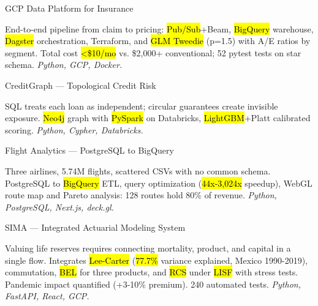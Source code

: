 \documentclass[10pt, letterpaper]{awesome-cv}
\begin{document}
\begin{cventries}

  \cventry
    {GCP Data Platform for Insurance}
    {}
    {}
    {}
    {
      \begin{cvitems}
        \item {End-to-end pipeline from claim to pricing: \hl{Pub/Sub}+Beam, \hl{BigQuery} warehouse, \hl{Dagster} orchestration, Terraform, and \hl{GLM Tweedie} (p=1.5) with A/E ratios by segment. Total cost \hl{<\$10/mo} vs. \$2,000+ conventional; 52 pytest tests on star schema. \textit{Python, GCP, Docker.}}
      \end{cvitems}
    }

  \cventry
    {CreditGraph — Topological Credit Risk}
    {}
    {}
    {}
    {
      \begin{cvitems}
        \item {SQL treats each loan as independent; circular guarantees create invisible exposure. \hl{Neo4j} graph with \hl{PySpark} on Databricks, \hl{LightGBM}+Platt calibrated scoring. \textit{Python, Cypher, Databricks.}}
      \end{cvitems}
    }

  \cventry
    {Flight Analytics — PostgreSQL to BigQuery}
    {}
    {}
    {}
    {
      \begin{cvitems}
        \item {Three airlines, 5.74M flights, scattered CSVs with no common schema. PostgreSQL to \hl{BigQuery} ETL, query optimization (\hl{44x-3,024x} speedup), WebGL route map and Pareto analysis: 128 routes hold 80\% of revenue. \textit{Python, PostgreSQL, Next.js, deck.gl.}}
      \end{cvitems}
    }

  \cventry
    {SIMA — Integrated Actuarial Modeling System}
    {}
    {}
    {}
    {
      \begin{cvitems}
        \item {Valuing life reserves requires connecting mortality, product, and capital in a single flow. Integrates \hl{Lee-Carter} (\hl{77.7\%} variance explained, Mexico 1990-2019), commutation, \hl{BEL} for three products, and \hl{RCS} under \hl{LISF} with stress tests. Pandemic impact quantified (+3-10\% premium). 240 automated tests. \textit{Python, FastAPI, React, GCP.}}
      \end{cvitems}
    }

\end{cventries}
\end{document}
